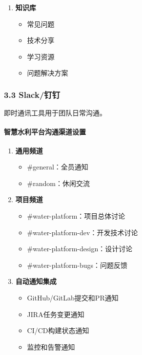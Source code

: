 \begin{enumerate}
  \begin{itemize}
  \tightlist
  \item
    需求评审
  \item
    技术评审
  \item
    每日站会
  \item
    迭代回顾
  \end{itemize}
\item
  \textbf{知识库}

  \begin{itemize}
  \tightlist
  \item
    常见问题
  \item
    技术分享
  \item
    学习资源
  \item
    问题解决方案
  \end{itemize}
\end{enumerate}

\subsubsection{3.3 Slack/钉钉}\label{slackux9489ux9489}

即时通讯工具用于团队日常沟通。

\paragraph{智慧水利平台沟通渠道设置}\label{ux667aux6167ux6c34ux5229ux5e73ux53f0ux6c9fux901aux6e20ux9053ux8bbeux7f6e}

\begin{enumerate}
\def\labelenumi{\arabic{enumi}.}
\tightlist
\item
  \textbf{通用频道}

  \begin{itemize}
  \tightlist
  \item
    \#general：全员通知
  \item
    \#random：休闲交流
  \end{itemize}
\item
  \textbf{项目频道}

  \begin{itemize}
  \tightlist
  \item
    \#water-platform：项目总体讨论
  \item
    \#water-platform-dev：开发技术讨论
  \item
    \#water-platform-design：设计讨论
  \item
    \#water-platform-bugs：问题反馈
  \end{itemize}
\item
  \textbf{自动通知集成}

  \begin{itemize}
  \tightlist
  \item
    GitHub/GitLab提交和PR通知
  \item
    JIRA任务变更通知
  \item
    CI/CD构建状态通知
  \item
    监控和告警通知
  \end{itemize}
\end{enumerate}

